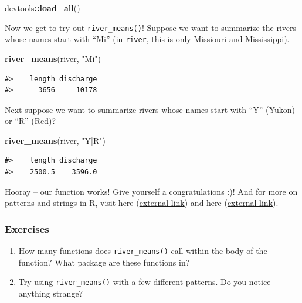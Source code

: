 \documentclass[
]{book}
\newenvironment{Shaded}{\begin{snugshade}}{\end{snugshade}}
\newcommand{\KeywordTok}[1]{\textcolor[rgb]{0.13,0.29,0.53}{\textbf{#1}}}
\newcommand{\NormalTok}[1]{#1}
\newcommand{\OperatorTok}[1]{\textcolor[rgb]{0.81,0.36,0.00}{\textbf{#1}}}
\newcommand{\StringTok}[1]{\textcolor[rgb]{0.31,0.60,0.02}{#1}}
\begin{document}
\begin{Shaded}
\begin{Highlighting}[]
\NormalTok{devtools}\OperatorTok{::}\KeywordTok{load_all}\NormalTok{()}
\end{Highlighting}
\end{Shaded}

Now we get to try out \texttt{river\_means()}! Suppose we want to summarize the rivers whose names start with ``Mi'' (in \texttt{river}, this is only Missiouri and Mississippi).

\begin{Shaded}
\begin{Highlighting}[]
\KeywordTok{river_means}\NormalTok{(river, }\StringTok{"Mi"}\NormalTok{)}
\end{Highlighting}
\end{Shaded}

\begin{verbatim}
#>    length discharge 
#>      3656     10178
\end{verbatim}

Next suppose we want to summarize rivers whose names start with ``Y'' (Yukon) or ``R'' (Red)?

\begin{Shaded}
\begin{Highlighting}[]
\KeywordTok{river_means}\NormalTok{(river, }\StringTok{"Y|R"}\NormalTok{)}
\end{Highlighting}
\end{Shaded}

\begin{verbatim}
#>    length discharge 
#>    2500.5    3596.0
\end{verbatim}

Hooray -- our function works! Give yourself a congratulations :)! And for more on patterns and strings in R, visit here (\href{https://r4ds.had.co.nz/strings.html}{external link}) and here (\href{https://bookdown.org/rdpeng/rprogdatascience/regular-expressions.html\#sub-and-gsub}{external link}).

\hypertarget{ex-set2}{%
\subsubsection{Exercises}\label{ex-set2}}

\begin{enumerate}
\def\labelenumi{\arabic{enumi}.}
\item
  How many functions does \texttt{river\_means()} call within the body of the function? What package are these functions in?
\item
  Try using \texttt{river\_means()} with a few different patterns. Do you notice anything strange?
\end{enumerate}
\end{document}

